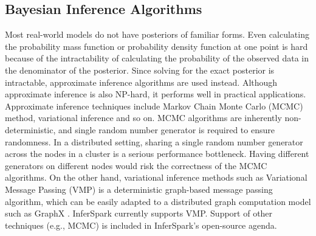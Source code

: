 \subsection{Bayesian Inference Algorithms}


Most real-world models do not have posteriors of familiar forms.
Even calculating the
probability mass function or probability density function at one point is hard
because of the intractability of calculating the probability of the
observed data in the denominator of the posterior. 
Since solving for the exact posterior is
intractable, approximate inference algorithms are used instead.
Although approximate inference is also NP-hard, it performs well in 
practical applications. 
Approximate inference techniques include Markov Chain Monte Carlo (MCMC) 
method, variational inference and so on.
MCMC algorithms are inherently non-deterministic, and single random number
generator is required to ensure randomness. In a distributed setting, sharing
a single random number generator across the nodes in a cluster is a serious
performance bottleneck. Having different generators on different nodes would
risk the correctness of the MCMC algorithms.
On the other hand, variational inference methods such as
Variational Message Passing (VMP) \cite{vmp}
is a deterministic graph-based message passing algorithm, 
which can be easily adapted to a distributed graph computation model such as
GraphX \cite{graphX}. 
InferSpark currently supports VMP.
Support of other techniques (e.g., MCMC) is included in InferSpark's open-source agenda.


%

